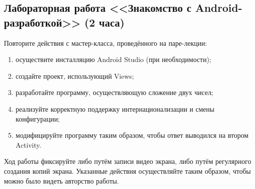 \subsection{Лабораторная работа <<Знакомство с Android-разработкой>> (2 часа)}

Повторите действия с мастер-класса, проведённого на паре-лекции:
\begin{enumerate}
	\item осуществите инсталляцию Android Studio (при необходимости);
	\item создайте проект, использующий Views;
	\item разработайте программу, осуществляющую сложение двух чисел;
	\item реализуйте корректную поддержку интернационализации и смены конфигурации;
	\item модифицируйте программу таким образом, чтобы ответ выводился на втором Activity.
\end{enumerate}

Ход работы фиксируйте либо путём записи видео экрана, либо путём регулярного создания копий экрана. Указанные действия осуществляйте таким образом,
чтобы можно было видеть авторство работы.
